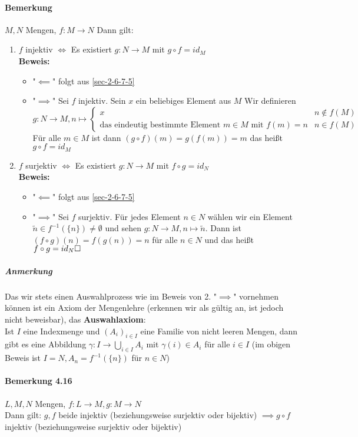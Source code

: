 \documentclass[a4paper]{scrartcl}
\theoremstyle{definition}
\theoremstyle{plain}
\theoremstyle{plain}
\theoremstyle{remark}
\theoremstyle{remark}
\theoremstyle{remark}
\theoremstyle{remark}
\theoremstyle{remark}
\begin{document}
\paragraph{Bemerkung}
\label{sec-2-6-7-7}
$M,N$ Mengen, $f:M\to N$ Dann gilt:
\begin{enumerate}
\item $f$ injektiv $\iff$ Es existiert $g:N\to M$ mit $g\circ f = id_M$ \\
        \textbf{Beweis:}
\begin{itemize}
\item "$\impliedby$" folgt aus \ref{sec-2-6-7-5}
\item "$\implies$" Sei $f$ injektiv. Sein $x$ ein beliebiges Element aus $M$
          Wir definieren \[g:N\to M,n\mapsto \begin{cases} x & n\not\in f(M) \\ \text{das eindeutig bestimmte Element $m\in M$ mit $f(m) = n$} & n\in f(M) \end{cases}\]
          Für alle $m\in M$ ist dann $(g\circ f)(m) = g(f(m)) = m$ das heißt $g\circ f = id_M$
\end{itemize}
\item $f$ surjektiv $\iff$ Es existiert $g:N\to M$ mit $f\circ g = id_N$ \\
        \textbf{Beweis:}
\begin{itemize}
\item "$\impliedby$" folgt aus \ref{sec-2-6-7-5}
\item "$\implies$" Sei $f$ surjektiv. Für jedes Element $n\in N$ wählen wir ein Element $\tilde n\in f^{-1}(\{n\}) \neq \emptyset$ und sehen
$g:N\to M,n\mapsto \tilde n$. Dann ist $(f\circ g)(n) = f(g(n)) = n$ für alle $n\in N$ und das heißt $f\circ g = id_N \hfill\square$
\end{itemize}
\end{enumerate}
\subparagraph{Anmerkung}
\label{sec-2-6-7-7-1}
Das wir stets einen Auswahlprozess wie im Beweis von 2. "$\implies$" vornehmen können ist ein Axiom der Mengenlehre (erkennen wir als gültig an, ist jedoch nicht beweisbar), das \textbf{Auswahlaxiom}: \\
      Ist $I$ eine Indexmenge und $(A_i)_{i\in I}$ eine Familie von nicht leeren Mengen, dann gibt es eine Abbildung $\gamma:I\to \bigcup_{i\in I} A_i$ mit $\gamma (i) \in A_i$ für alle $i\in I$ (im obigen Beweis ist $I = N,A_n = f^{-1}(\{n\})$ für $n\in N$)
\paragraph{Bemerkung 4.16}
\label{sec-2-6-7-8}
$L,M,N$ Mengen, $f:L\to M, g:M\to N$ \\
     Dann gilt: $g,f$ beide injektiv (beziehungsweise surjektiv oder bijektiv) $\implies g\circ f$ injektiv (beziehungsweise surjektiv oder bijektiv)
\end{document}
